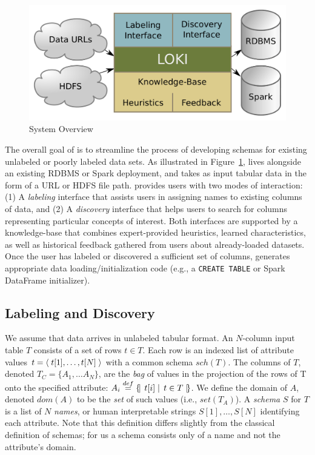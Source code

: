 
\begin{figure}
\centering
\includegraphics[width=0.8\columnwidth]{graphics/system.pdf}
\caption{System Overview}
\label{fig:overview}
\trimfigurespacing
\vspace*{-1mm}
\end{figure}

The overall goal of \systemname is to streamline the process of developing schemas for existing unlabeled or poorly labeled data sets.  
As illustrated in Figure~\ref{fig:overview}, \systemname lives alongside an existing RDBMS or Spark deployment, and takes as input tabular data in the form of a URL or HDFS file path.
\systemname provides users with two modes of interaction: (1) A \emph{labeling} interface that assists users in assigning names to existing columns of data, and (2) A \emph{discovery} interface that helps users to search for columns representing particular concepts of interest.  
Both interfaces are supported by a knowledge-base that combines expert-provided heuristics, learned characteristics, as well as historical feedback gathered from users about already-loaded datasets.
Once the user has labeled or discovered a sufficient set of columns, \systemname generates appropriate data loading/initialization code (e.g., a \texttt{CREATE TABLE} or Spark DataFrame initializer).  


\subsection{Labeling and Discovery}

We assume that data arrives in unlabeled tabular format.  
An $N$-column input table $T$ consists of a set of rows $t \in T$.
Each row is an indexed list of attribute values $t = \left<\;{t[1], \ldots, t[N]}\;\right>$ with a common schema $sch(T)$.
The columns of $T$, denoted $T_C = \{A_1, \ldots A_N\}$, are the \emph{bag} of values in the projection of the rows of T onto the specified attribute: $A_i \overset{def}{=} \left\{\!\left|\left.\;{t[i]}\;\right|\;{t \in T}\;\right|\!\right\}$.
We define the domain of $A$, denoted $dom(A)$ to be the \emph{set} of such values (i.e., $set(T_A)$).  
A \emph{schema} $S$ for $T$ is a list of $N$ \emph{names}, or human interpretable strings $S[1], \ldots, S[N]$ identifying each attribute.
Note that this definition differs slightly from the classical definition of schemas; for us a schema consists only of a name and not the attribute's domain.

